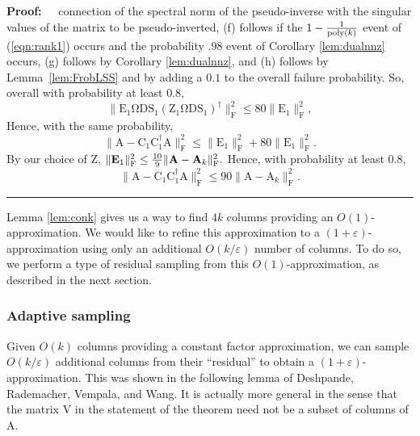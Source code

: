 \documentclass[11pt]{article}
\newcommand{\FNormS}[1]{\mbox{}\|#1\|_\mathrm{F}^2}
\newcommand{\pinv}[1]{ {#1}^\dagger}
\newenvironment{proof}{\begin{trivlist} \item {\bf Proof:~~}}
  {\qed\end{trivlist}}
\newcommand{\mat}[1]{{\ensuremath{\bm{\mathrm{#1}}}}}
\def\matA{\mat{A}}
\def\matC{\mat{C}}
\def\matD{\mat{D}}
\def\matE{\mat{E}}
\def\matS{\mat{S}}
\def\matV{\mat{V}}
\def\matZ{\mat{Z}}
\def\matOmega{\mat{\Omega}}
\def\matOmega{\mat{\Omega}}
\def\frac#1#2{{#1\over #2}}
\def\qed{\hfill\rule{2mm}{2mm}}
\newcommand{\eps}{\varepsilon}
\newcommand{\poly}{{\mathrm{poly}}}
\begin{document}
\begin{proof}
connection of the spectral norm of the pseudo-inverse with the singular values of the matrix to be pseudo-inverted,
(f) follows if the $1-\frac{1}{\poly(k)}$ event of (\ref{eqn:rank1}) occurs and the probability $.98$ event of 
Corollary \ref{lem:dualnnz} occurs, 
(g) follows by Corollary \ref{lem:dualnnz}, and
(h) follows by Lemma~\ref{lem:FrobLSS} and by adding a $0.1$ to the overall failure probability.
So, overall with probability at least $0.8,$
$$ \FNormS{\matE_1 \matOmega \matD \matS_1(\matZ_1\matOmega \matD \matS_1)^{\dagger}} \le 80 \FNormS{\matE_1},$$
Hence,
with the same probability,
$$\FNormS{ \matA - \matC_1 \pinv{\matC}_1\matA } \le\FNormS{\matE_1} +  80 \FNormS{\matE_1}.$$
By our choice of $\matZ$, $\FNormS{\matE_1} \leq \frac{10}{9} \FNormS{\matA - \matA_k}.$
Hence, with probability at least $0.8$,
$$ \FNormS{ \matA - \matC_1 \pinv{\matC}_1\matA } \le 90 \FNormS{\matA - \matA_k}.$$
\end{proof}

Lemma \ref{lem:conk} gives us a way to find $4k$ columns providing an $O(1)$-approximation. We would like
to refine this approximation to a $(1+\eps)$-approximation using only an additional $O(k/\eps)$ number of columns.
To do so, we perform a type of residual sampling from this $O(1)$-approximation, as described in the next section.

\subsubsection{Adaptive sampling}\label{sec:adaptiveSampling}
Given $O(k)$ columns providing a constant factor approximation, we can sample $O(k/\eps)$ additional 
columns from their ``residual'' to obtain a $(1+\eps)$-approximation. This was shown in the following
lemma of Deshpande, Rademacher, Vempala, and Wang. It is actually more general in the sense that the matrix $\matV$
in the statement of the theorem need not be a subset of columns of $\matA$. 
\end{document}

